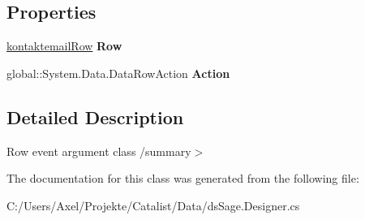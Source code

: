 \subsection*{Properties}
\begin{DoxyCompactItemize}
\item 
\hyperlink{class_products_1_1_data_1_1ds_sage_1_1kontaktemail_row}{kontaktemail\+Row} {\bfseries Row}\hypertarget{class_products_1_1_data_1_1ds_sage_1_1kontaktemail_row_change_event_a6d4f0d4dbc8acf6542371b8316e4ccd1}{}\label{class_products_1_1_data_1_1ds_sage_1_1kontaktemail_row_change_event_a6d4f0d4dbc8acf6542371b8316e4ccd1}

\item 
global\+::\+System.\+Data.\+Data\+Row\+Action {\bfseries Action}\hypertarget{class_products_1_1_data_1_1ds_sage_1_1kontaktemail_row_change_event_a07d3d279f415975ab7d1205d533424c4}{}\label{class_products_1_1_data_1_1ds_sage_1_1kontaktemail_row_change_event_a07d3d279f415975ab7d1205d533424c4}

\end{DoxyCompactItemize}


\subsection{Detailed Description}
Row event argument class /summary$>$ 

The documentation for this class was generated from the following file\+:\begin{DoxyCompactItemize}
\item 
C\+:/\+Users/\+Axel/\+Projekte/\+Catalist/\+Data/ds\+Sage.\+Designer.\+cs\end{DoxyCompactItemize}
